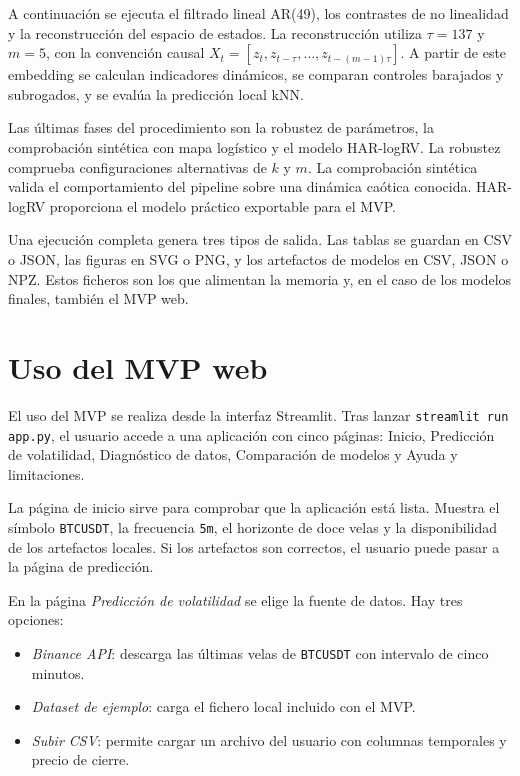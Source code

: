 A continuación se ejecuta el filtrado lineal AR(49), los contrastes de no linealidad y la reconstrucción del espacio de estados. La reconstrucción utiliza \(\tau=137\) y \(m=5\), con la convención causal \(X_t = [z_t, z_{t-\tau}, \ldots, z_{t-(m-1)\tau}]\). A partir de este embedding se calculan indicadores dinámicos, se comparan controles barajados y subrogados, y se evalúa la predicción local kNN.

Las últimas fases del procedimiento son la robustez de parámetros, la comprobación sintética con mapa logístico y el modelo HAR-logRV. La robustez comprueba configuraciones alternativas de \(k\) y \(m\). La comprobación sintética valida el comportamiento del pipeline sobre una dinámica caótica conocida. HAR-logRV proporciona el modelo práctico exportable para el MVP.

Una ejecución completa genera tres tipos de salida. Las tablas se guardan en CSV o JSON, las figuras en SVG o PNG, y los artefactos de modelos en CSV, JSON o NPZ. Estos ficheros son los que alimentan la memoria y, en el caso de los modelos finales, también el MVP web.

\section{Uso del MVP web}\label{sec:uso-mvp}

El uso del MVP se realiza desde la interfaz Streamlit. Tras lanzar \texttt{streamlit run app.py}, el usuario accede a una aplicación con cinco páginas: Inicio, Predicción de volatilidad, Diagnóstico de datos, Comparación de modelos y Ayuda y limitaciones.

La página de inicio sirve para comprobar que la aplicación está lista. Muestra el símbolo \texttt{BTCUSDT}, la frecuencia \texttt{5m}, el horizonte de doce velas y la disponibilidad de los artefactos locales. Si los artefactos son correctos, el usuario puede pasar a la página de predicción.

En la página \textit{Predicción de volatilidad} se elige la fuente de datos. Hay tres opciones:

\begin{itemize}
    \item \textit{Binance API}: descarga las últimas velas de \texttt{BTCUSDT} con intervalo de cinco minutos.
    \item \textit{Dataset de ejemplo}: carga el fichero local incluido con el MVP.
    \item \textit{Subir CSV}: permite cargar un archivo del usuario con columnas temporales y precio de cierre.
\end{itemize}

